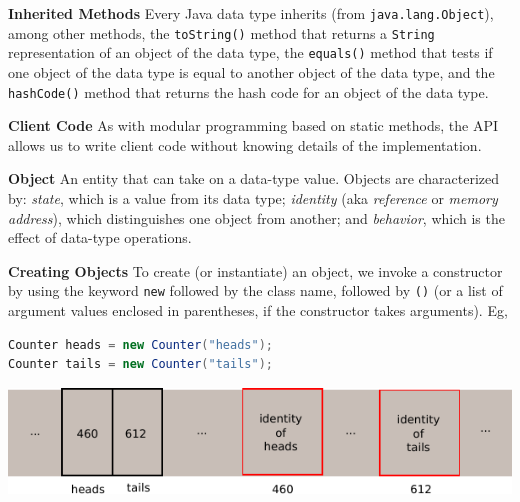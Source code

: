 \documentclass[8pt,a4paper,compress]{beamer}
\begin{document}
\begin{frame}[fragile]
\pause

\textbf{Inherited Methods} Every Java data type inherits (from \lstinline$java.lang.Object$), among other methods, the \lstinline$toString()$ method that returns a \lstinline$String$ representation of an object of the data type, the \lstinline$equals()$ method that tests if one object of the data type is equal to another object of the data type, and the \lstinline$hashCode()$ method that returns the hash code for an object of the data type.

\pause
\smallskip

\textbf{Client Code} As with modular programming based on static methods, the API allows us to write client code without knowing details of the implementation. 

\pause
\smallskip

\textbf{Object} An entity that can take on a data-type value. Objects are characterized by: \emph{state}, which is a value from its data type; \emph{identity} (aka \emph{reference} or \emph{memory address}), which distinguishes one object from another; and \emph{behavior}, which is the effect of data-type operations.

\pause
\smallskip

\textbf{Creating Objects} To create (or instantiate) an object, we invoke a constructor by using the keyword \lstinline$new$ followed by the class name, followed by \lstinline$()$ (or a list of argument values enclosed in parentheses, if the constructor takes arguments). Eg, 

\begin{lstlisting}[language=Java]
Counter heads = new Counter("heads");
Counter tails = new Counter("tails");
\end{lstlisting}

\begin{center}
\includegraphics[scale=0.8]{./figures/obj_rep.pdf}
\end{center}

\end{frame}
\end{document}
